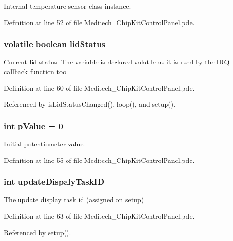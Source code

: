 Internal temperature sensor class instance. 



Definition at line 52 of file Meditech\-\_\-\-Chip\-Kit\-Control\-Panel.\-pde.

\hypertarget{_meditech___chip_kit_control_panel_8pde_adea51712174a5f82a31231a67e0d4608}{
\subsubsection[{lid\-Status}]{\setlength{\rightskip}{0pt plus 5cm}volatile boolean lid\-Status}}\label{_meditech___chip_kit_control_panel_8pde_adea51712174a5f82a31231a67e0d4608}


Current lid status. The variable is declared volatile as it is used by the I\-R\-Q callback function too. 



Definition at line 60 of file Meditech\-\_\-\-Chip\-Kit\-Control\-Panel.\-pde.



Referenced by is\-Lid\-Status\-Changed(), loop(), and setup().

\hypertarget{_meditech___chip_kit_control_panel_8pde_a3134d7e85042180eb421c3f6ee88d3b3}{
\subsubsection[{p\-Value}]{\setlength{\rightskip}{0pt plus 5cm}int p\-Value = 0}}\label{_meditech___chip_kit_control_panel_8pde_a3134d7e85042180eb421c3f6ee88d3b3}


Initial potentiometer value. 



Definition at line 55 of file Meditech\-\_\-\-Chip\-Kit\-Control\-Panel.\-pde.

\hypertarget{_meditech___chip_kit_control_panel_8pde_a527a89c41abb1d8660b53f5e727e655c}{
\subsubsection[{update\-Dispaly\-Task\-I\-D}]{\setlength{\rightskip}{0pt plus 5cm}int update\-Dispaly\-Task\-I\-D}}\label{_meditech___chip_kit_control_panel_8pde_a527a89c41abb1d8660b53f5e727e655c}


The update display task id (assigned on setup) 



Definition at line 63 of file Meditech\-\_\-\-Chip\-Kit\-Control\-Panel.\-pde.



Referenced by setup().

